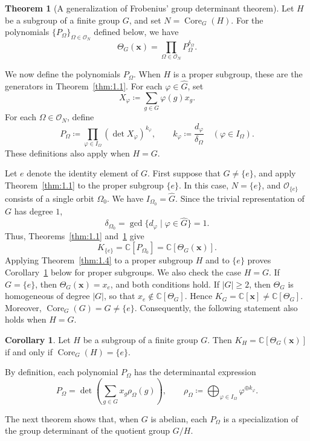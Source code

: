 \documentclass[12pt,a4paper]{article}
\theoremstyle{definition}
\newtheorem{thm}[definition]{Theorem}
\newtheorem{cor}[definition]{Corollary}
\numberwithin{definition}{section}
\DeclareMathOperator{\Core}{Core}
\begin{document}
\begin{thm}[A generalization of Frobenius' group determinant theorem]\label{thm:1.5}
Let $H$ be a subgroup of a finite group $G$, and set $N=\Core_G(H)$.
For the polynomials $\{P_\Omega\}_{\Omega\in\mathcal O_N}$ defined below,
we have
\[
\Theta_G(\bm x)=\prod_{\Omega\in\mathcal O_N}P_\Omega^{\delta_\Omega}.
\]
\end{thm}

We now define the polynomials $P_\Omega$.
When $H$ is a proper subgroup, these are the generators in
Theorem~\ref{thm:1.1}.
For each $\varphi\in\widehat G$, set
\[
X_\varphi\coloneqq\sum_{g\in G}\varphi(g)x_g.
\]
For each $\Omega\in\mathcal O_N$, define
\[
P_\Omega\coloneqq
\prod_{\varphi\in I_\Omega}(\det X_\varphi)^{k_\varphi},
\qquad
k_\varphi\coloneqq\frac{d_\varphi}{\delta_\Omega}
\quad(\varphi\in I_\Omega).
\]
These definitions also apply when $H=G$.

Let $e$ denote the identity element of $G$.
First suppose that $G\ne\{e\}$, and apply Theorem~\ref{thm:1.1}
to the proper subgroup $\{e\}$.
In this case, $N=\{e\}$, and $\mathcal O_{\{e\}}$ consists of a single
orbit $\Omega_0$.
We have $I_{\Omega_0}=\widehat G$. Since the trivial representation of $G$
has degree $1$,
\[
\delta_{\Omega_0}
=\gcd\{d_\varphi\mid\varphi\in\widehat G\}
=1.
\]
Thus, Theorems~\ref{thm:1.1} and~\ref{thm:1.5} give
\[
K_{\{e\}}
=\mathbb C[P_{\Omega_0}]
=\mathbb C[\Theta_G(\bm x)].
\]
Applying Theorem~\ref{thm:1.4} to a proper subgroup $H$ and to $\{e\}$
proves Corollary~\ref{cor:1.6} below for proper subgroups.
We also check the case $H=G$.
If $G=\{e\}$, then $\Theta_G(\bm x)=x_e$, and both conditions hold.
If $|G|\ge2$, then $\Theta_G$ is homogeneous of degree $|G|$, so that
$x_e\notin\mathbb C[\Theta_G]$. Hence
$K_G=\mathbb C[\bm x]\ne\mathbb C[\Theta_G]$.
Moreover, $\Core_G(G)=G\ne\{e\}$.
Consequently, the following statement also holds when $H=G$.

\begin{cor}\label{cor:1.6}
Let $H$ be a subgroup of a finite group $G$. Then
$K_H=\mathbb C[\Theta_G(\bm x)]$ if and only if $\Core_G(H)=\{e\}$.
\end{cor}

By definition, each polynomial $P_\Omega$ has the determinantal expression
\[
P_\Omega
=\det\left(\sum_{g\in G}x_g\rho_\Omega(g)\right),
\qquad
\rho_\Omega\coloneqq
\bigoplus_{\varphi\in I_\Omega}\varphi^{\oplus k_\varphi}.
\]

The next theorem shows that, when $G$ is abelian, each $P_\Omega$ is a
specialization of the group determinant of the quotient group $G/H$.
\end{document}
